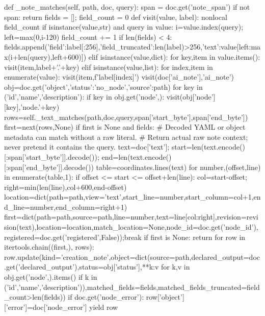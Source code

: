     def _note_matches(self, path, doc, query):
        span = doc.get('note_span')
        if not span: return
        fields = []; field_count = 0
        def visit(value, label):
            nonlocal field_count
            if isinstance(value,str) and query in value:
                i=value.index(query); left=max(0,i-120)
                field_count += 1
                if len(fields) < 4:
                    fields.append({'field':label[:256],'field_truncated':len(label)>256,'text':value[left:max(i+len(query),left+600)]})
            elif isinstance(value,dict):
                for key,item in value.items(): visit(item,label+'.'+key)
            elif isinstance(value,list):
                for index,item in enumerate(value): visit(item,f'{label}[{index}]')
        visit(doc['ai_note'],'ai_note')
        obj=doc.get('object',{'status':'no_node','source':path})
        for key in ('id','name','description'):
            if key in obj.get('node',{}): visit(obj['node'][key],'node.'+key)
        rows=self._text_matches(path,doc,query,span['start_byte'],span['end_byte'])
        first=next(rows,None)
        if first is None and fields:
            # Decoded YAML or object metadata can match without a raw literal.
            # Return actual raw note context; never pretend it contains the query.
            text=doc['text']; start=len(text.encode()[:span['start_byte']].decode()); end=len(text.encode()[:span['end_byte']].decode())
            table=coordinates.lines(text)
            for number,(offset,line) in enumerate(table,1):
                if offset <= start <= offset+len(line):
                    col=start-offset; right=min(len(line),col+600,end-offset)
                    location=dict(path=path,view='text',start_line=number,start_column=col+1,end_line=number,end_column=right+1)
                    first=dict(path=path,source=path,line=number,text=line[col:right],revision=revision(text),location=location,match_location=None,node_id=doc.get('node_id'),registered=doc.get('registered',False));break
        if first is None: return
        for row in itertools.chain((first,), rows):
            row.update(kind='creation_note',object=dict(source=path,declared_output=doc.get('declared_output'),status=obj['status'],**{k:v for k,v in obj.get('node',{}).items() if k in ('id','name','description')}),matched_fields=fields,matched_fields_truncated=field_count>len(fields))
            if doc.get('node_error'): row['object']['error']=doc['node_error']
            yield row

